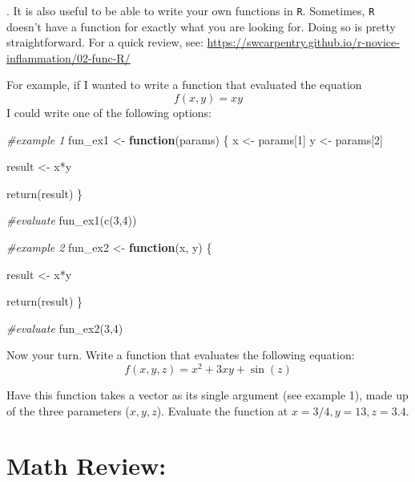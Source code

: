 \documentclass[
]{article}
\newenvironment{Shaded}{\begin{snugshade}}{\end{snugshade}}
\newcommand{\CommentTok}[1]{\textcolor[rgb]{0.56,0.35,0.01}{\textit{#1}}}
\newcommand{\ControlFlowTok}[1]{\textcolor[rgb]{0.13,0.29,0.53}{\textbf{#1}}}
\newcommand{\DecValTok}[1]{\textcolor[rgb]{0.00,0.00,0.81}{#1}}
\newcommand{\FunctionTok}[1]{\textcolor[rgb]{0.00,0.00,0.00}{#1}}
\newcommand{\NormalTok}[1]{#1}
\newcommand{\OtherTok}[1]{\textcolor[rgb]{0.56,0.35,0.01}{#1}}
\newcommand{\SpecialCharTok}[1]{\textcolor[rgb]{0.00,0.00,0.00}{#1}}
\begin{document}
\newpage

. It is also useful to be able to write your own functions in
\texttt{R}. Sometimes, \texttt{R} doesn't have a function for exactly
what you are looking for. Doing so is pretty straightforward. For a
quick review, see:
\url{https://swcarpentry.github.io/r-novice-inflammation/02-func-R/}

For example, if I wanted to write a function that evaluated the equation
\[f(x, y) = xy \] I could write one of the following options:

\begin{Shaded}
\begin{Highlighting}[]
\CommentTok{\#example 1}
\NormalTok{fun\_ex1 }\OtherTok{\textless{}{-}} \ControlFlowTok{function}\NormalTok{(params) \{}
\NormalTok{  x }\OtherTok{\textless{}{-}}\NormalTok{ params[}\DecValTok{1}\NormalTok{]}
\NormalTok{  y }\OtherTok{\textless{}{-}}\NormalTok{ params[}\DecValTok{2}\NormalTok{]}
  
\NormalTok{  result }\OtherTok{\textless{}{-}}\NormalTok{ x}\SpecialCharTok{*}\NormalTok{y}
  
  \FunctionTok{return}\NormalTok{(result)}
\NormalTok{\}}

\CommentTok{\#evaluate}
\FunctionTok{fun\_ex1}\NormalTok{(}\FunctionTok{c}\NormalTok{(}\DecValTok{3}\NormalTok{,}\DecValTok{4}\NormalTok{))}


\CommentTok{\#example 2}
\NormalTok{fun\_ex2 }\OtherTok{\textless{}{-}} \ControlFlowTok{function}\NormalTok{(x, y) \{}
  
\NormalTok{  result }\OtherTok{\textless{}{-}}\NormalTok{ x}\SpecialCharTok{*}\NormalTok{y}
  
  \FunctionTok{return}\NormalTok{(result)}
\NormalTok{\}}

\CommentTok{\#evaluate}
\FunctionTok{fun\_ex2}\NormalTok{(}\DecValTok{3}\NormalTok{,}\DecValTok{4}\NormalTok{)}
\end{Highlighting}
\end{Shaded}

Now your turn. Write a function that evaluates the following equation:
\[f(x, y, z) = x^2 + 3xy + \sin(z)
\]

Have this function takes a vector as its single argument (see example
1), made up of the three parameters (\(x, y, z\)). Evaluate the function
at \(x = 3/4, y = 13, z = 3.4\).

\newpage

\hypertarget{math-review}{%
\section{Math Review:}\label{math-review}}
\end{document}
